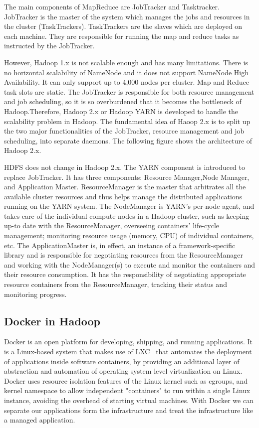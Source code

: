 The main components of MapReduce are JobTracker and Tasktracker. JobTracker is the master of the system which manages the jobs and resources in the cluster (TaskTrackers).  TaskTrackers are the slaves which are deployed on each machine. They are responsible for running the map and reduce tasks as instructed by the JobTracker.

However, Hadoop 1.x  is not scalable enough and has many limitations. There is no horizontal scalability of NameNode and it does not support NameNode High Availability. It can only support up to 4,000 nodes per cluster. Map and Reduce task slots are static. The JobTracker is responsible for both resource management and job scheduling, so it is so overburdened that it becomes the bottleneck of Hadoop.Therefore, Hadoop 2.x or Hadoop YARN is developed to handle the scalability problem in Hadoop. The fundamental idea of Haoop 2.x is to split up the two major functionalities of the JobTracker, resource management and job scheduling, into separate daemons. The following figure shows the architecture of Hadoop 2.x.



HDFS does not change in Hadoop 2.x. The YARN component is introduced to replace JobTracker. It has three components: Resource Manager,Node Manager, and Application Master. ResourceManager is the master that arbitrates all the available cluster resources and thus helps manage the distributed applications running on the YARN system. The NodeManager is YARN’s per-node agent, and takes care of the individual compute nodes in a Hadoop cluster, such as keeping up-to date with the ResourceManager, overseeing containers’ life-cycle management; monitoring resource usage (memory, CPU) of individual containers, etc. The ApplicationMaster is, in effect, an instance of a framework-specific library and is responsible for negotiating resources from the ResourceManager and working with the NodeManager(s) to execute and monitor the containers and their resource consumption. It has the responsibility of negotiating appropriate resource containers from the ResourceManager, tracking their status and monitoring progress.

\subsection{Docker in Hadoop}
Docker is an open platform for developing, shipping, and running applications. It is a Linux-based system that makes use of LXC~\cite{helsley2009lxc} that automates the deployment of applications inside software containers, by providing an additional layer of abstraction and automation of operating system level virtualization on Linux. Docker uses resource isolation features of the Linux kernel such as cgroups, and kernel namespace to allow independent "containers" to run within a single Linux instance, avoiding the overhead of starting virtual machines. With Docker we can separate our applications form the infrastructure and treat the infrastructure like a managed application. 

